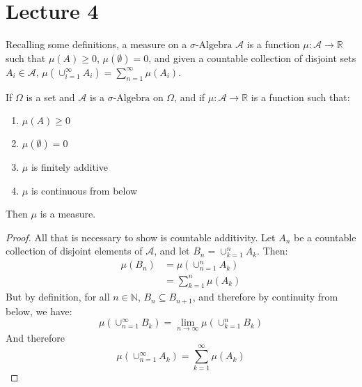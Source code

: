 \documentclass[crop=false,class=book,oneside]{standalone}
\begin{document}
    \section{Lecture 4}
        Recalling some definitions, a measure on a $\sigma\textrm{-Algebra}$
        $\mathcal{A}$ is a function
        $\mu:\mathcal{A}\rightarrow\mathbb{R}$ such that
        $\mu(A)\geq{0}$, $\mu(\emptyset)=0$, and given a countable
        collection of disjoint sets $A_{i}\in\mathcal{A}$,
        $\mu(\cup_{i=1}^{\infty}A_{i})=\sum_{n=1}^{\infty}\mu(A_{i})$.
        \begin{theorem}
            If $\Omega$ is a set and $\mathcal{A}$ is a
            $\sigma\text{-Algebra}$ on $\Omega$, and if
            $\mu:\mathcal{A}\rightarrow\mathbb{R}$ is a function such that:
            \begin{enumerate}
                \item $\mu(A)\geq{0}$
                \item $\mu(\emptyset)=0$
                \item $\mu$ is finitely additive
                \item $\mu$ is continuous from below
            \end{enumerate}
            Then $\mu$ is a measure.
        \end{theorem}
        \begin{proof}
            All that is necessary to show is countable additivity.
            Let $A_{n}$ be a countable collection of disjoint elements
            of $\mathcal{A}$, and let $B_{n}=\cup_{k=1}^{n}A_{k}$.
            Then:
            \begin{align}
                \mu(B_{n})&=\mu(\cup_{n=1}^{n}A_{k})\\
                &=\sum_{k=1}^{n}\mu(A_{k})
            \end{align}
            But by definition, for all $n\in\mathbb{N}$,
            $B_{n}\subseteq{B_{n+1}}$, and therefore by continuity from
            below, we have:
            \begin{equation}
                \mu(\cup_{n=1}^{\infty}B_{k})
                =\lim_{n\rightarrow\infty}\mu(\cup_{k=1}^{n}B_{k})
            \end{equation}
            And therefore
            \begin{equation}
                \mu(\cup_{n=1}^{\infty}A_{k})=
                \sum_{k=1}^{\infty}\mu(A_{k})
            \end{equation}
        \end{proof}
\end{document}
